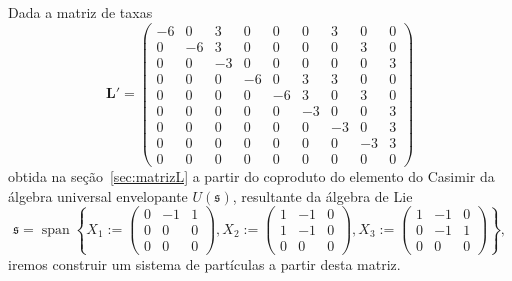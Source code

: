 \documentclass[twoside,openright,titlepage,numbers=noenddot,headinclude,  lineheaders footinclude=true,cleardoublepage=empty,
                                BCOR=5mm,paper=a4,fontsize=12pt ]{scrbook}
\theoremstyle{definition}
\DeclareMathOperator{\spn}{span}
\begin{document}
Dada a matriz de taxas 
\[
\bm{L}' = 
\begin{pmatrix}
   -6 &  0 & 3 &  0 &  0 &  0 & 3 &  0 &  0\\ 
   0 &  -6 & 3 &  0 &  0 &  0 &  0 & 3 &  0\\
   0 &  0 &  -3 &  0 &  0 &  0 &  0 &  0 & 3\\
   0 &  0 &  0 &  -6 &  0 & 3 & 3 &  0 &  0\\
   0 &  0 &  0 &  0 &  -6 & 3 &  0 & 3 &  0\\
   0 &  0 &  0 &  0 &  0 &  -3 &  0 &  0 & 3\\
   0 &  0 &  0 &  0 &  0 &  0 &  -3 &  0 & 3\\
   0 &  0 &  0 &  0 &  0 &  0 &  0 &  -3 & 3\\
   0 &  0 &  0 &  0 &  0 &  0 &  0 &  0 &  0
\end{pmatrix}
\]
obtida na seção~\ref{sec:matrizL}  a partir do coproduto do elemento do Casimir da álgebra universal envelopante $U(\mathfrak{s})$,
resultante
da álgebra de Lie 
\[ \mathfrak{s} = \spn \left\{
X_1:=
\begin{pmatrix}
0 & -1 & 1 \\
0 & 0 & 0 \\
0 & 0 & 0 
\end{pmatrix}
,
X_2:=
\begin{pmatrix}
1 & -1 & 0 \\
1 & -1& 0 \\
0 & 0 & 0 
\end{pmatrix}
,
X_3:=
\begin{pmatrix}
1 & -1 & 0 \\
0 & -1& 1 \\
0 & 0 & 0 
\end{pmatrix}
\right\},
\]
iremos construir um sistema de partículas 
a partir desta matriz.
\end{document}
